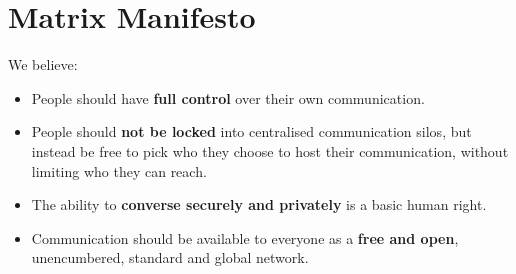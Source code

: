 \documentclass[../flyer.tex]{subfiles}
\begin{document}

\section*{Matrix Manifesto}

We believe:

\begin{itemize}
    \item People should have \textbf{full control} over their own communication.
    \item People should \textbf{not be locked} into centralised communication silos,
          but instead be free to pick who they choose to host their communication, without limiting
          who they can reach.
    \item The ability to \textbf{converse securely and privately} is a basic human right.
    \item Communication should be available to everyone as a \textbf{free and open}, unencumbered, standard and global network.
\end{itemize}
\end{document}
